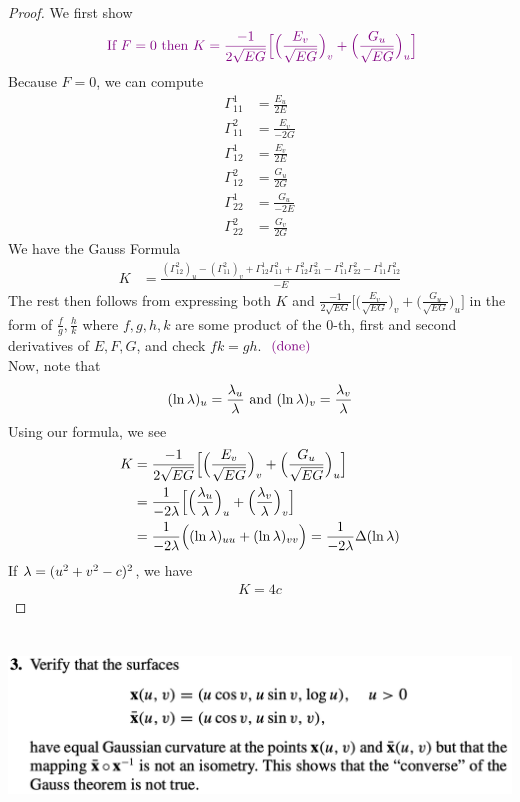 \documentclass{report}
\begin{document}
\begin{proof}
We first show 
\begin{align*}
\textcolor{violet}{\text{ If }F=0\text{ then }K=\frac{-1}{2\sqrt{EG}}\Big[ \Big( \frac{E_v}{\sqrt{EG} } \Big)_v + \Big( \frac{G_u}{\sqrt{EG} } \Big)_u \Big]}
\end{align*}
Because $F=0$, we can compute 
\begin{align*}
\Gamma^1_{11}&= \frac{E_u}{2E}\\
\Gamma^2_{11}&= \frac{E_v}{-2G}\\
\Gamma^1_{12}&= \frac{E_v}{2E}\\
\Gamma^2_{12}&= \frac{G_u}{2G}\\
\Gamma^1_{22}&= \frac{G_u}{-2E}\\
\Gamma^2_{22}&= \frac{G_v}{2G}
\end{align*}
We have the Gauss Formula 
\begin{align*}
  K&= \frac{(\Gamma ^2_{12})_u - (\Gamma^2_{11})_v + \Gamma^1_{12} \Gamma^2_{11} + \Gamma^2_{12}\Gamma^2_{21}- \Gamma^2_{11}\Gamma^2_{22}-\Gamma^1_{11}\Gamma^2_{12}}{-E}
\end{align*}
The rest then follows from expressing both $K$  and  $\frac{-1}{2\sqrt{EG}}\Big[\Big(\frac{E_v}{\sqrt{EG} } \Big)_v + \Big( \frac{G_u}{\sqrt{EG} } \Big)_u  \Big]$ in the form of $\frac{f}{g}, \frac{h}{k}$ where $f,g,h,k$ are some product of the 0-th, first and second derivatives of  $E,F,G$, and check $fk=gh$. $\textcolor{violet}{\text{ (done) }}$\\


Now, note that 
\begin{align*}
 (\ln \lambda )_{u}= \frac{\lambda_u}{\lambda }\text{ and }(\ln \lambda )_{v}=  \frac{\lambda_v}{\lambda}
\end{align*}
Using our formula, we see 
\begin{align*}
K&= \frac{-1}{2\sqrt{EG}}\Big[\Big(\frac{E_v}{\sqrt{EG} } \Big)_v + \Big( \frac{G_u}{\sqrt{EG} } \Big)_u  \Big]\\
&=\frac{1}{-2\lambda } \Big[ \Big( \frac{\lambda_u}{\lambda } \Big)_u + \Big( \frac{\lambda _v}{\lambda } \Big)_v \Big]\\
&=\frac{1}{-2 \lambda } \Big( (\ln \lambda )_{uu}+ (\ln  \lambda )_{vv} \Big)= \frac{1}{-2\lambda } \Delta (\ln \lambda )
\end{align*}
If $\lambda = (u^2+v^2-c)^2$, we have 
\begin{align*}
K=4c
\end{align*}
\end{proof}
\begin{question}{}{}
\includegraphics[height=5cm,width=18cm]{hw69}
\end{question}
\end{document}
